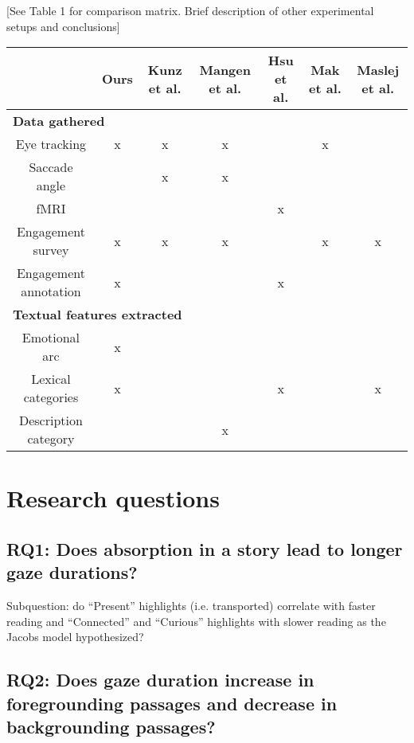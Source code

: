 \documentclass[11pt]{article}
\begin{document}
[See Table 1 for comparison matrix. Brief description of other experimental setups and conclusions]

\begin{table*}[t]
\centering
\begin{tabular}{|c|c|c|c|c|c|c|}
\hline
& \textbf{Ours} & \textbf{Kunz et al.} & \textbf{Mangen et al.} & \textbf{Hsu et al.} & \textbf{Mak et al.} & \textbf{Maslej et al.} \\
\hline
\multicolumn{7}{|l|}{\textbf{Data gathered}}\\\hline
Eye tracking & x & x & x &  & x &  \\\hline
Saccade angle &  & x & x &  &  & \\\hline
fMRI &  &  &  & x &  & \\\hline
Engagement survey & x & x & x &  & x & x\\\hline
Engagement annotation & x &  &  & x &  & \\\hline
\multicolumn{7}{|l|}{\textbf{Textual features extracted}}\\\hline
Emotional arc & x &  &  &  &  & \\\hline
Lexical categories & x &  &  & x &  & x\\\hline
Description category &  &  & x &  &  & \\\hline

\end{tabular}
\caption{Comparison between our study and other similar experiments.}
\label{tab:accents}
\end{table*}

\section{Research questions}

\subsection{RQ1: Does absorption in a story lead to longer gaze durations?}

Subquestion: do “Present” highlights (i.e. transported) correlate with faster reading and “Connected” and “Curious” highlights with slower reading as the Jacobs model hypothesized?

\subsection{RQ2: Does gaze duration increase in foregrounding passages and decrease in backgrounding passages?}
\end{document}
